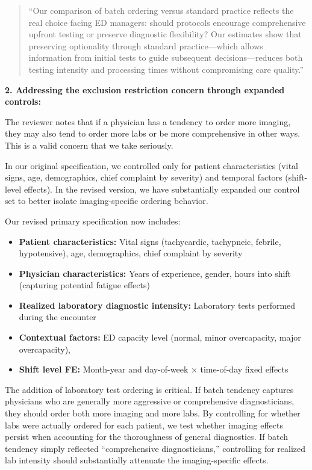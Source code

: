\documentclass[11pt]{article}
\newcommand{\1}{\hbox{\rm 1\kern-.35em 1}}
\begin{document}
\begin{quote}
``Our comparison of batch ordering versus standard practice reflects the real choice facing ED managers: should protocols encourage comprehensive upfront testing or preserve diagnostic flexibility? Our estimates show that preserving optionality through standard practice—which allows information from initial tests to guide subsequent decisions—reduces both testing intensity and processing times without compromising care quality.''
\end{quote}

\textbf{2. Addressing the exclusion restriction concern through expanded controls:}

The reviewer notes that if a physician has a tendency to order more imaging, they may also tend to order more labs or be more comprehensive in other ways. This is a valid concern that we take seriously.

In our original specification, we controlled only for patient characteristics (vital signs, age, demographics, chief complaint by severity) and temporal factors (shift-level effects). In the revised version, we have substantially expanded our control set to better isolate imaging-specific ordering behavior.

Our revised primary specification now includes:

\begin{itemize}
\item \textbf{Patient characteristics:} Vital signs (tachycardic, tachypneic, febrile, hypotensive), age, demographics, chief complaint by severity
\item \textbf{Physician characteristics:} Years of experience, gender, hours into shift (capturing potential fatigue effects)
\item \textbf{Realized laboratory diagnostic intensity:} Laboratory tests performed during the encounter
\item \textbf{Contextual factors:} ED capacity level (normal, minor overcapacity, major overcapacity),
\item \textbf{Shift level FE:} Month-year and day-of-week $\times$ time-of-day fixed effects
\end{itemize}

The addition of laboratory test ordering is critical. If batch tendency captures physicians who are generally more aggressive or comprehensive diagnosticians, they should order both more imaging and more labs. By controlling for whether labs were actually ordered for each patient, we test whether imaging effects persist when accounting for the thoroughness of general diagnostics. If batch tendency simply reflected ``comprehensive diagnosticians,'' controlling for realized lab intensity should substantially attenuate the imaging-specific effects.
\end{document}
